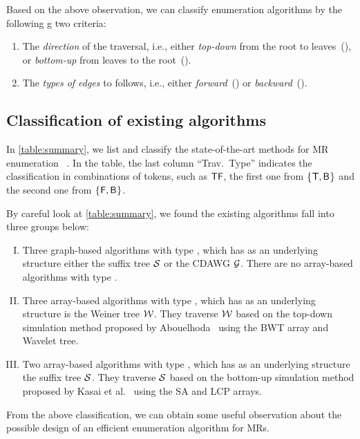 Based on the above observation, we can classify enumeration algorithms by the following g two criteria: 
\begin{enumerate}[(1)]
\item The \textit{direction} of the traversal, i.e., either \textit{top-down} from the root to leaves~(\td), or \textit{bottom-up} from leaves to the root~(\bu). 
\item The \textit{types of edges} to follows, i.e., either \textit{forward}~(\fw) or \textit{backward}~(\bw). 
\end{enumerate}

\subsection{Classification of existing algorithms}

In \cref{table:summary}, we list and classify the state-of-the-art methods for MR enumeration ~\cite{narisawa2007efficient,okanohara2009linear,beller:berger2012space:efficient:bbo,belazzougui2020linear,nishimoto:cpm2021enum}. In the table, the last column ``Trav.~Type'' indicates the classification in combinations of tokens, such as $\mbox{\ensuremath{\mathsf{T}}\ensuremath{\mathsf{F}}}$, the first one from $\{\kern0.05em\mathsf{T}, \mathsf{B}\kern0.05em\}$ and the second one from $\{\kern0.05em\mathsf{F}, \mathsf{B}\kern0.05em\}$. 

By careful look at \cref{table:summary}, we found the existing algorithms fall into three groups below: 
\begin{enumerate}[(I)]
\item Three graph-based algorithms with type \tdfw, which has as an underlying structure either the suffix tree $\mathcal{S}$ or the CDAWG $\mathcal{G}$. 
There are no array-based algorithms with type \tdfw. 

\item Three array-based algorithms with type \tdbw, which has as an underlying structure is the Weiner tree $\mathcal{W}$. They traverse $\mathcal{W}$ based on the top-down simulation method proposed by Abouelhoda~\cite{abouelhoda2004replacing} using the BWT array and Wavelet tree. 


\item Two array-based algorithms with type \bufw, which has as an  underlying structure the suffix tree $\mathcal{S}$. They traverse $\mathcal{S}$ based on the bottom-up simulation method proposed by Kasai et al.~\cite{kasai:lee2001lcp:linear} 
using the SA and LCP arrays. 
\end{enumerate}

From the above classification, we can obtain some useful observation about the possible design of an efficient enumeration algorithm for MRs. 

